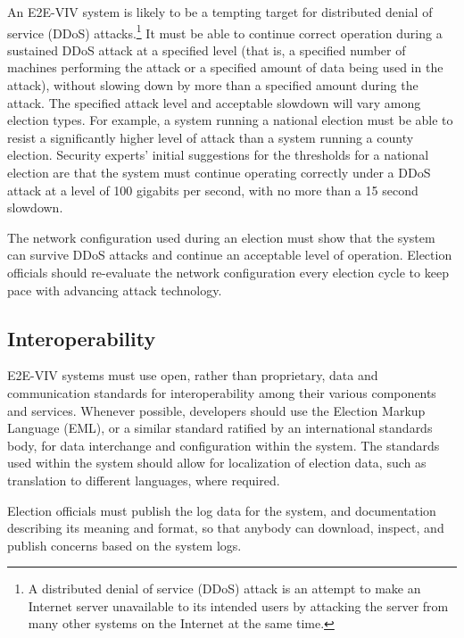 An E2E-VIV system is likely to be a tempting target for distributed
denial of service (DDoS) attacks.\footnote{A distributed denial of
  service (DDoS) attack is an attempt to make an Internet server
  unavailable to its intended users by attacking the server from many
  other systems on the Internet at the same time.} It must be able to
continue correct operation during a sustained DDoS attack at a
specified level (that is, a specified number of machines performing
the attack or a specified amount of data being used in the attack),
without slowing down by more than a specified amount during the
attack.  The specified attack level and acceptable slowdown will vary
among election types. For example, a system running a national
election must be able to resist a significantly higher level of attack
than a system running a county election. Security experts' initial
suggestions for the thresholds for a national election are that the
system must continue operating correctly under a DDoS attack at a
level of 100 gigabits per second, with no more than a 15 second
slowdown.

The network configuration used during an election must show that the
system can survive DDoS attacks and continue an acceptable level of
operation. Election officials should re-evaluate the network
configuration every election cycle to keep pace with advancing attack
technology.

\subsection{Interoperability}
\label{sec:interoperability}

E2E-VIV systems must use open, rather than proprietary, data and
communication standards for interoperability among their various
components and services. Whenever possible, developers should use the
Election Markup Language (EML), or a similar standard ratified by an
international standards body, for data interchange and configuration
within the system. The standards used within the system should allow
for localization of election data, such as translation to different
languages, where required.

Election officials must publish the log data for the system, and
documentation describing its meaning and format, so that anybody can
download, inspect, and publish concerns based on the system logs.

